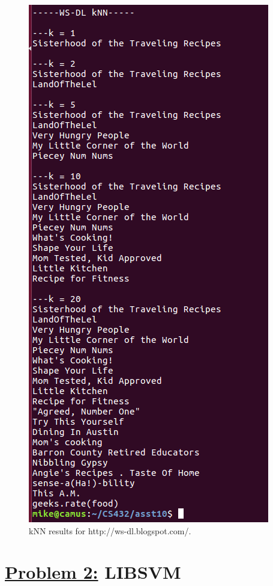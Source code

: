 \documentclass{article}
\begin{document}
\begin{figure}[H]
 \centering
 \includegraphics[width=8 cm]{ws.png}
  \caption{kNN results for http://ws-dl.blogspot.com/.}
\end{figure}


\section*{{\underline{\huge {Problem 2:}} LIBSVM  }}




\end{document}
